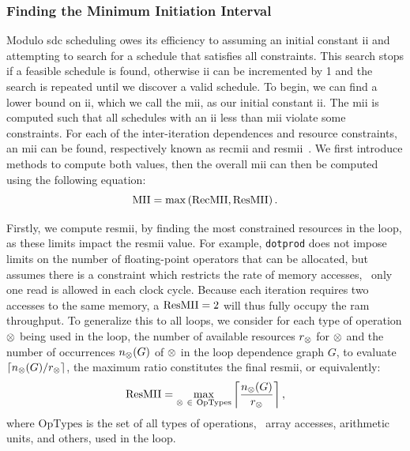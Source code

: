 \subsubsection{Finding the Minimum Initiation Interval}

Modulo \gls{sdc} scheduling owes its efficiency to assuming an initial
constant \gls{ii} and attempting to search for a schedule that satisfies all
constraints.  This search stops if a feasible schedule is found, otherwise
\gls{ii} can be incremented by 1 and the search is repeated until we discover
a valid schedule.  To begin, we can find a lower bound on \gls{ii}, which we
call the \gls{mii}, as our initial constant \gls{ii}\@.  The \gls{mii} is
computed such that all schedules with an \gls{ii} less than \gls{mii} violate
some constraints.  For each of the inter-iteration dependences and resource
constraints, an \gls{mii} can be found, respectively known as \gls{recmii} and
\gls{resmii}~\cite{rau94, canis14, zhang13}.  We first introduce methods to
compute both values, then the overall \gls{mii} can then be computed using the
following equation:
\begin{equation}
    \mathrm{MII} = \max\left(\mathrm{RecMII}, \mathrm{ResMII}\right).
\end{equation}

Firstly, we compute \gls{resmii}, by finding the most constrained resources
in the loop, as these limits impact the \gls{resmii} value.  For example,
\verb|dotprod| does not impose limits on the number of floating-point operators
that can be allocated, but assumes there is a constraint which restricts the
rate of memory accesses, \ie~only one read is allowed in each clock cycle.
Because each iteration requires two accesses to the same memory, a $\mathrm{ResMII} =
2$ will thus fully occupy the \gls{ram} throughput.  To generalize this to all
loops, we consider for each type of operation $\otimes$ being used in the
loop, the number of available resources $r_\otimes$ for $\otimes$ and the
number of occurrences $n_\otimes(G)$ of $\otimes$ in the loop dependence
graph $G$, to evaluate $\left\lceil n_\otimes(G) / r_\otimes \right\rceil$,
the maximum ratio constitutes the final \gls{resmii}, or equivalently:
\begin{equation}
    \mathrm{ResMII} = \max_{\otimes~\in~\mathrm{OpTypes}}
        \left\lceil
            \frac{n_\otimes(G)}{r_\otimes}
        \right\rceil,
\end{equation}
where $\mathrm{OpTypes}$ is the set of all types of operations, \eg~array
accesses, arithmetic units, and others, used in the loop.

